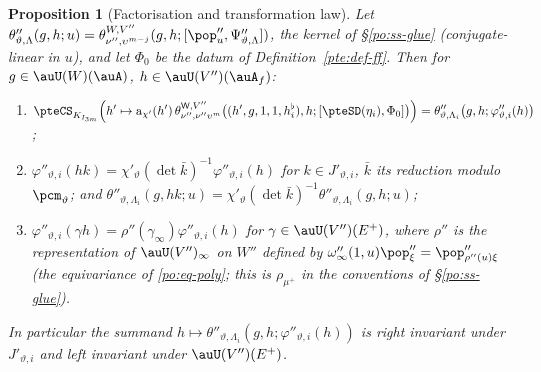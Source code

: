 \documentclass[10pt]{amsart}
\newtheorem{proposition}[theorem]{Proposition}
\theoremstyle{definition}
\theoremstyle{remark}
\begin{document}
\begin{proposition}[Factorisation and transformation law]\label{ptf:ff}
Let $\theta''_{\vartheta,\Lambda}(g,h;u)=\theta^{W,V''}_{\nu'',\upsilon^{m-j}}(g,h;[\pop''_u,\Psi''_{\vartheta,\Lambda}])$, the kernel of
\S\ref{po:ss-glue} (conjugate-linear in $u$), and let $\Phi_0$ be the datum of Definition~\ref{pte:def-ff}. Then for
$g\in\auU(W)(\auA)$, $h\in\auU(V'')(\auA_f)$:
\begin{enumerate}
\item[(a)] $\displaystyle\pteCS_{K_{I_{3m}}}\Bigl(h'\mapsto\mathrm a_{\chi'}(h')\,\theta^{\mathsf W,V''}_{\nu'',\nu''\upsilon^m}\bigl((h',g,1,1,h^\flat_i),h;
[\pteSD(\eta_i),\Phi_0]\bigr)\Bigr)=\theta''_{\vartheta,\Lambda_i}\bigl(g,h;\varphi''_{\vartheta,i}(h)\bigr)$;
\item[(b)] $\varphi''_{\vartheta,i}(hk)=\chi'_\vartheta(\det\bar k)^{-1}\varphi''_{\vartheta,i}(h)$ for $k\in J'_{\vartheta,i}$, $\bar k$ its
reduction modulo $\pcm_\vartheta$; and $\theta''_{\vartheta,\Lambda_i}(g,hk;u)=\chi'_\vartheta(\det\bar k)^{-1}\theta''_{\vartheta,\Lambda_i}(g,h;u)$;
\item[(c)] $\varphi''_{\vartheta,i}(\gamma h)=\rho''(\gamma_\infty)\varphi''_{\vartheta,i}(h)$ for $\gamma\in\auU(V'')(E^+)$, where
$\rho''$ is the representation of $\auU(V'')_\infty$ on $W''$ defined by $\omega''_\infty(1,u)\pop''_\xi=\pop''_{\rho''(u)\xi}$
(the equivariance of \eqref{po:eq-poly}; this is $\rho_{\mu^+}$ in the conventions of \S\ref{po:ss-glue}).
\end{enumerate}
In particular the summand $h\mapsto\theta''_{\vartheta,\Lambda_i}(g,h;\varphi''_{\vartheta,i}(h))$ is right invariant under
$J'_{\vartheta,i}$ and left invariant under $\auU(V'')(E^+)$.
\end{proposition}
\end{document}
